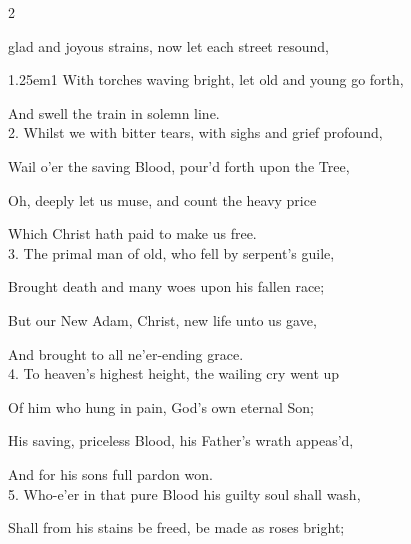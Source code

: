 \clearpage
{}



\firstEvensong
{}

\firstEvensongHymn

\begin{multicols}{2}
\sloppy

 glad and joyous strains, now let each street resound,


\begin{hangparas}{1.25em}{1}
With torches waving bright, let old and young go forth,

And swell the train in solemn line.\\

2. Whilst we with bitter tears, with sighs and grief profound,

Wail o'er the saving Blood, pour'd forth upon the Tree,

Oh, deeply let us muse, and count the heavy price

Which Christ hath paid to make us free.\\

3. The primal man of old, who fell by serpent's guile,

Brought death and many woes upon his fallen race;

But our New Adam, Christ, new life unto us gave,

And brought to all ne'er-ending grace.\\

4. To heaven's highest height, the wailing cry went up

Of him who hung in pain, God's own eternal Son;

His saving, priceless Blood, his Father's wrath appeas'd,

And for his sons full pardon won.\\

5. Who-e'er in that pure Blood his guilty soul shall wash,

Shall from his stains be freed, be made as roses bright;


\end{hangparas}
\end{multicols}
